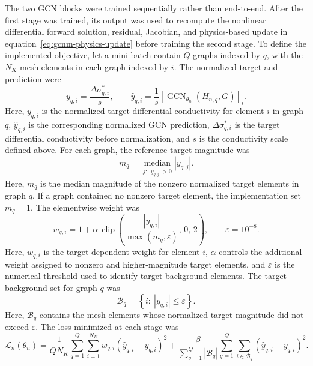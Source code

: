 \documentclass[11pt]{article}
\begin{document}
The two GCN blocks were trained sequentially rather than end-to-end.
After the first stage was trained, its output was used to recompute the nonlinear differential forward solution, residual, Jacobian, and physics-based update in equation~\eqref{eq:gcnm-physics-update} before training the second stage.
To define the implemented objective, let a mini-batch contain $Q$ graphs indexed by $q$, with the $N_K$ mesh elements in each graph indexed by $i$.
The normalized target and prediction were
\begin{equation*}
    y_{q,i}
    =
    \frac{\Delta\sigma^{*}_{q,i}}{s},
    \qquad
    \widehat y_{q,i}
    =
    \frac{1}{s}
    \left[
        \operatorname{GCN}_{\theta_n}\!\left(H_{n,q},G\right)
    \right]_i.
\end{equation*}
Here, $y_{q,i}$ is the normalized target differential conductivity for element $i$ in graph $q$, $\widehat y_{q,i}$ is the corresponding normalized GCN prediction, $\Delta\sigma^{*}_{q,i}$ is the target differential conductivity before normalization, and $s$ is the conductivity scale defined above.
For each graph, the reference target magnitude was
\begin{equation*}
    m_q
    =
    \underset{j:\,|y_{q,j}|>0}{\operatorname{median}}
    |y_{q,j}|.
\end{equation*}
Here, $m_q$ is the median magnitude of the nonzero normalized target elements in graph $q$.
If a graph contained no nonzero target element, the implementation set $m_q=1$.
The elementwise weight was
\begin{equation*}
    w_{q,i}
    =
    1+\alpha\,
    \operatorname{clip}\!\left(
        \frac{|y_{q,i}|}{\max(m_q,\varepsilon)},\,0,\,2
    \right),
    \qquad
    \varepsilon=10^{-8}.
\end{equation*}
Here, $w_{q,i}$ is the target-dependent weight for element $i$, $\alpha$ controls the additional weight assigned to nonzero and higher-magnitude target elements, and $\varepsilon$ is the numerical threshold used to identify target-background elements.
The target-background set for graph $q$ was
\begin{equation*}
    \mathcal B_q
    =
    \left\{i:\ |y_{q,i}|\leq\varepsilon\right\}.
\end{equation*}
Here, $\mathcal B_q$ contains the mesh elements whose normalized target magnitude did not exceed $\varepsilon$.
The loss minimized at each stage was
\begingroup
\small
\begin{equation}
    \mathcal L_n(\theta_n)
    =
    \frac{1}{QN_K}\sum_{q=1}^{Q}\sum_{i=1}^{N_K}
    w_{q,i}\left(\widehat y_{q,i}-y_{q,i}\right)^2
    +
    \frac{\beta}{\sum_{q=1}^{Q}|\mathcal B_q|}
    \sum_{q=1}^{Q}\sum_{i\in\mathcal B_q}
    \left(\widehat y_{q,i}-y_{q,i}\right)^2.
\label{eq:gcnm-training-loss}
\end{equation}
\end{document}
